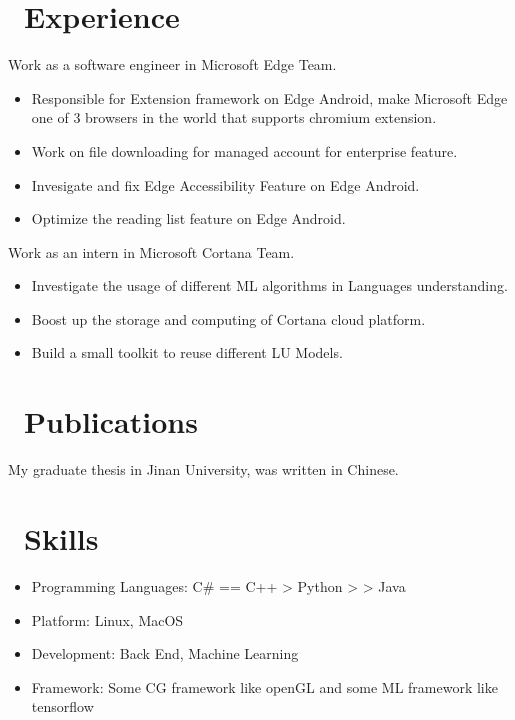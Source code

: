 \documentclass{resume}
\begin{document}
\section{\faUsers\ Experience}

Work as a software engineer in Microsoft Edge Team.
\begin{itemize}
    \item Responsible for Extension framework on Edge Android, make Microsoft Edge one of 3 browsers in the world that supports chromium extension.
    \item Work on file downloading for managed account for enterprise feature.
    \item Invesigate and fix Edge Accessibility Feature on Edge Android.
    \item Optimize the reading list feature on Edge Android.
\end{itemize}

Work as an intern in Microsoft Cortana Team.
\begin{itemize}
    \item Investigate the usage of different ML algorithms in Languages understanding.
    \item Boost up the storage and computing of Cortana cloud platform.
    \item Build a small toolkit to reuse different LU Models.
\end{itemize}

\section{\faCogs\ Publications}
My graduate thesis in Jinan University, was written in Chinese.

\section{\faCogs\ Skills}
\begin{itemize}[parsep=0.5ex]
  \item Programming Languages: C\# == C++ > Python > > Java
  \item Platform: Linux, MacOS
  \item Development: Back End, Machine Learning
	\item Framework: Some CG framework like openGL and some ML framework like tensorflow
\end{itemize}
\end{document}
